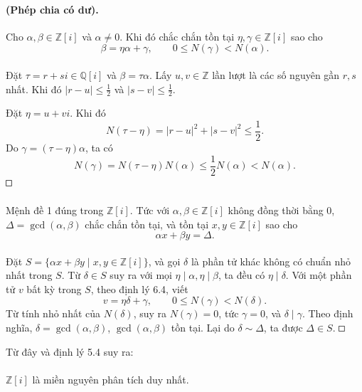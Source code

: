 \documentclass[11pt]{article}
\newcommand{\square}{\mathord{\vcenter{\hrule height .5pt
  \hbox{\vrule width .5pt height 5pt\kern5pt\vrule width .5pt}
  \hrule height .5pt}}}
\begin{document}
\paragraph{ (Phép chia có dư).}
Cho \(\alpha,\beta\in\mathbb Z[i]\) và \(\alpha\ne0\). Khi đó chắc chắn tồn
tại \(\eta,\gamma\in\mathbb Z[i]\) sao cho
\[
  \beta=\eta\alpha+\gamma,\qquad 0\le N(\gamma)<N(\alpha).
\tag{21}
\]

\paragraph{}
Đặt \(\tau=r+si\in\mathbb Q[i]\) và \(\beta=\tau\alpha\). Lấy
\(u,v\in\mathbb Z\) lần lượt là các số nguyên gần \(r,s\) nhất. Khi đó
\(|r-u|\le\frac12\) và \(|s-v|\le\frac12\).

Đặt \(\eta=u+vi\). Khi đó
\[
  N(\tau-\eta)=|r-u|^2+|s-v|^2\le \frac12.
\]
Do \(\gamma=(\tau-\eta)\alpha\), ta có
\[
  N(\gamma)=N(\tau-\eta)N(\alpha)\le\frac12N(\alpha)<N(\alpha).
\]
\(\square\)

\paragraph{}
Mệnh đề 1 đúng trong \(\mathbb Z[i]\). Tức với
\(\alpha,\beta\in\mathbb Z[i]\) không đồng thời bằng \(0\),
\(\Delta=\gcd(\alpha,\beta)\) chắc chắn tồn tại, và tồn tại
\(x,y\in\mathbb Z[i]\) sao cho
\[
  \alpha x+\beta y=\Delta.
\]

\paragraph{}
Đặt \(S=\{\alpha x+\beta y\mid x,y\in\mathbb Z[i]\}\), và gọi \(\delta\) là
phần tử khác không có chuẩn nhỏ nhất trong \(S\). Từ \(\delta\in S\) suy ra
với mọi \(\eta\mid\alpha,\eta\mid\beta\), ta đều có \(\eta\mid\delta\). Với
một phần tử \(v\) bất kỳ trong \(S\), theo định lý 6.4, viết
\[
  v=\eta\delta+\gamma,\qquad 0\le N(\gamma)<N(\delta).
\]
Từ tính nhỏ nhất của \(N(\delta)\), suy ra \(N(\gamma)=0\), tức
\(\gamma=0\), và \(\delta\mid\gamma\). Theo định nghĩa,
\(\delta=\gcd(\alpha,\beta)\), \(\gcd(\alpha,\beta)\) tồn tại. Lại do
\(\delta\sim\Delta\), ta được \(\Delta\in S\). \(\square\)

Từ đây và định lý 5.4 suy ra:

\paragraph{}
\(\mathbb Z[i]\) là miền nguyên phân tích duy nhất.
\end{document}
